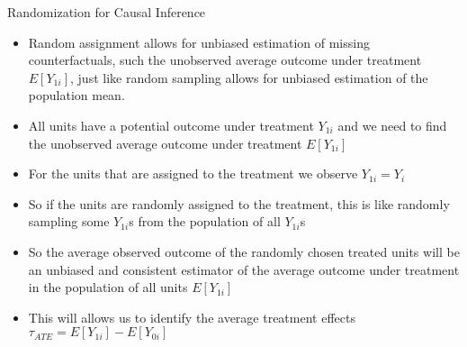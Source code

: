 \documentclass{beamer}
\numberwithin{equation}{section}
\begin{document}
\begin{frame}{Randomization for Causal Inference}
\small
\begin{itemize}
\item Random assignment allows for unbiased estimation of missing counterfactuals, such the unobserved average outcome under treatment $E[Y_{1i}]$, just like random sampling allows for unbiased estimation of the population mean.
\item All units have a potential outcome under treatment $Y_{1i}$ and we need to find the unobserved average outcome under treatment $E[Y_{1i}]$
\item For the units that are assigned to the treatment we observe $Y_{1i}=Y_i$ 
\item So if the units are randomly assigned to the treatment, this is like randomly sampling some $Y_{1i}$s from the population of all $Y_{1i}$s
\item So the average observed outcome of the randomly chosen treated units will be an unbiased and consistent estimator of the average  outcome under treatment in the population of all units $E[Y_{1i}]$
\item This will allows us to identify the average treatment effects $\tau_{ATE}=E[Y_{1i}]-E[Y_{0i}]$
\end{itemize}

\end{frame}
\end{document}
